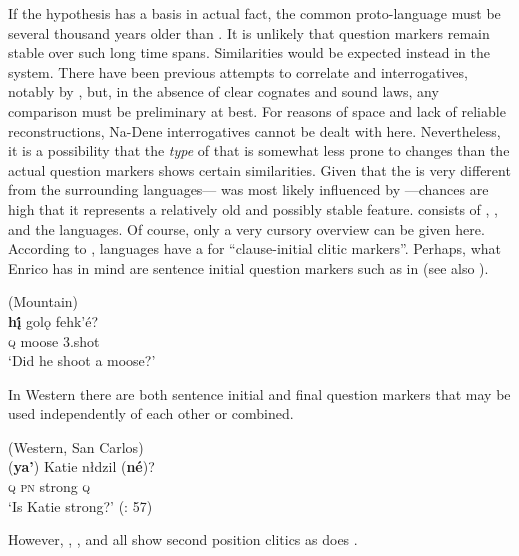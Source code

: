 If the  hypothesis \citep{Vajda2010} has a basis in actual fact, the common proto-language must be several thousand years older than . It is unlikely that question markers remain stable over such long time spans. Similarities would be expected instead in the  system. There have been previous attempts to correlate  and  interrogatives, notably by \cite[157ff.]{Werner2004}, but, in the absence of clear cognates and sound laws, any comparison must be preliminary at best. For reasons of space and lack of reliable reconstructions, Na-Dene interrogatives cannot be dealt with here. Nevertheless, it is a possibility that the \textit{type} of  that is somewhat less prone to changes than the actual question markers shows certain similarities. Given that the   is very different from the surrounding languages--- was most likely influenced by ---chances are high that it represents a relatively old and possibly stable feature.  consists of , , and the  languages. Of course, only a very cursory overview can be given here. According to \citet[267]{Enrico2004},  languages have a  for “clause-initial clitic  markers”. Perhaps, what Enrico has in mind are sentence initial question markers such as in  (see also ).

\ea%
    \label{ex:yeni:12}
     (Mountain)\\
    \gll \textbf{{h}}\textbf{{\'{\k{i}}}} golǫ  fehk’é?\\
    \textsc{q}  moose  3.shot\\
    \glt ‘Did he shoot a moose?’ \citep[1123]{Rice1989}
    \z

In Western  there are both sentence initial and final question markers that may be used independently of each other or combined.

\ea%
    \label{ex:yeni:13}
     (Western, San Carlos)\\
    \gll (\textbf{{ya’}})  Katie  nłdzil  (\textbf{{né}})?\\
    \textsc{q}  \textsc{pn}  strong  \textsc{q}\\
    \glt ‘Is Katie strong?’ (\citealt{deReuse2006}: 57)
    \z

However, , , and  all show second position clitics as does .

